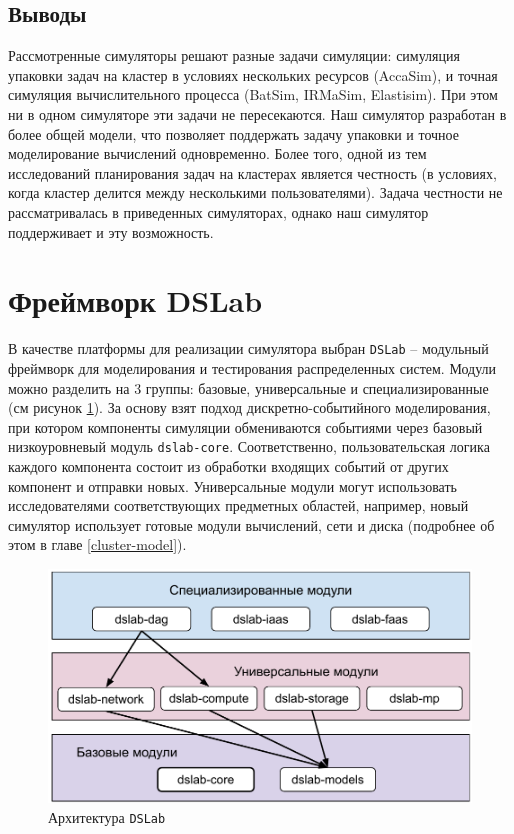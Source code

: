 \subsection{Выводы}

Рассмотренные симуляторы решают разные задачи симуляции: симуляция упаковки задач на кластер в условиях нескольких ресурсов (AccaSim), и точная симуляция вычислительного процесса (BatSim, IRMaSim, Elastisim). При этом ни в одном симуляторе эти задачи не пересекаются. Наш симулятор разработан в более общей модели, что позволяет поддержать задачу упаковки и точное моделирование вычислений одновременно. Более того, одной из тем исследований планирования задач на кластерах является честность (в условиях, когда кластер делится между несколькими пользователями). Задача честности не рассматривалась в приведенных симуляторах, однако наш симулятор поддерживает и эту возможность.



\section{Фреймворк DSLab}


В качестве платформы для реализации симулятора выбран \texttt{DSLab} -- модульный фреймворк для моделирования и тестирования распределенных систем. Модули можно разделить на 3 группы: базовые, универсальные и специализированные (см рисунок \ref{fig:dslab_arc}). За основу взят подход дискретно-событийного моделирования, при котором компоненты симуляции обмениваются событиями через базовый низкоуровневый модуль \texttt{dslab-core}. Соответственно, пользовательская логика каждого компонента состоит из обработки входящих событий от других компонент и отправки новых. Универсальные модули могут использовать исследователями соответствующих предметных областей, например, новый симулятор использует готовые модули вычислений, сети и диска (подробнее об этом в главе \ref{cluster-model}). 

\begin{figure}[H]
    \centering
\includegraphics[width=0.7\linewidth]{images/dslab_arc}
\caption{Архитектура \texttt{DSLab}}
\label{fig:dslab_arc}
\end{figure}

